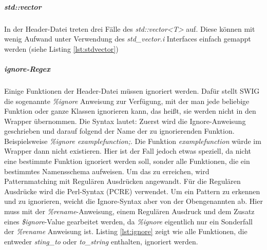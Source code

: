 \begin{code}[caption={std::map},label={lst:stdmap}, escapechar=|]

	

\end{code}

\subparagraph{std::vector}

In der Header-Datei treten drei Fälle des \emph{std::vector<T>} auf. Diese können mit wenig Aufwand unter Verwendung des \emph{std\_vector.i} Interfaces einfach gemappt werden (siehe Listing \ref{lst:stdvector})

\begin{code}[caption={std::vector},label={lst:stdvector}, escapechar=|]

\end{code}

\subparagraph{ignore-Regex}
Einige Funktionen der Header-Datei müssen ignoriert werden. Dafür stellt SWIG die sogenannte \emph{\%ignore} Anweisung zur Verfügung, mit der man jede beliebige Funktion oder ganze Klassen ignorieren kann, das heißt, sie werden nicht in den Wrapper übernommen. Die Syntax lautet: Zuerst wird die Ignore-Anweisung geschrieben und darauf folgend der Name der zu ignorierenden Funktion. Beispielsweise \emph{\%ignore examplefunction;}. Die Funktion \emph{examplefunction} würde im Wrapper dann nicht existieren. Hier ist der Fall jedoch etwas speziell, da nicht eine bestimmte Funktion ignoriert werden soll, sonder alle Funktionen, die ein bestimmtes Namensschema aufweisen. Um das zu erreichen, wird Patternmatching mit Regulären Ausdrücken angewandt. Für die Regulären Ausdrücke wird die Perl-Syntax (PCRE) verwendet. Um ein Pattern zu erkennen und zu ignorieren, weicht die Ignore-Syntax aber von der Obengenannten ab. Hier muss mit der \emph{\%rename}-Anweisung, einem Regulären Ausdruck und dem Zusatz eines \emph{\$ignore}-Value gearbeitet werden, da \emph{\%ignore} eigentlich nur ein Sonderfall der \emph{\%rename} Anweisung ist.
Listing \ref{lst:ignore} zeigt wie alle Funktionen, die entweder \emph{sting\_to} oder \emph{to\_string} enthalten, ignoriert werden.

